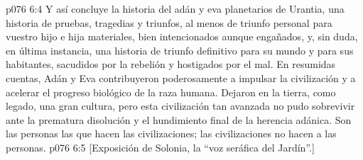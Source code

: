 \vs p076 6:4 \pc Y así concluye la historia del adán y eva planetarios de Urantia, una historia de pruebas, tragedias y triunfos, al menos de triunfo personal para vuestro hijo e hija materiales, bien intencionados aunque engañados, y, sin duda, en última instancia, una historia de triunfo definitivo para su mundo y para sus habitantes, sacudidos por la rebelión y hostigados por el mal. En resumidas cuentas, Adán y Eva contribuyeron poderosamente a impulsar la civilización y a acelerar el progreso biológico de la raza humana. Dejaron en la tierra, como legado, una gran cultura, pero esta civilización tan avanzada no pudo sobrevivir ante la prematura disolución y el hundimiento final de la herencia adánica. Son las personas las que hacen las civilizaciones; las civilizaciones no hacen a las personas.
\vsetoff
\vs p076 6:5 [Exposición de Solonia, la “voz seráfica del Jardín”.]
